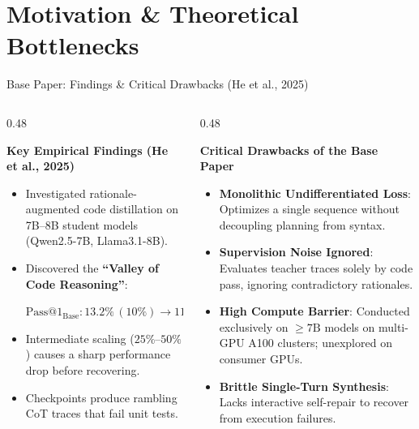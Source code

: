\documentclass[aspectratio=169,10pt]{beamer}
\begin{document}
\section{Motivation \& Theoretical Bottlenecks}

\begin{frame}{Base Paper: Findings \& Critical Drawbacks (He et al., 2025)}
  \begin{columns}[T]
    \begin{column}{0.48\textwidth}
      \begin{block}{\textbf{Key Empirical Findings (He et al., 2025)}}
        \begin{itemize}\itemsep=2.5pt\footnotesize
          \item Investigated rationale-augmented code distillation on 7B--8B student models (Qwen2.5-7B, Llama3.1-8B).
          \item Discovered the \textbf{``Valley of Code Reasoning''}:
          \begin{center}
            \scriptsize
            $\text{Pass@1}_{\text{Base}}: 13.2\% \,(10\%) \to \mathbf{11.2\% \,(25\%)} \to 17.6\% \,(100\%)$
          \end{center}
          \item Intermediate scaling ($25\%\text{--}50\%$) causes a sharp performance drop before recovering.
          \item Checkpoints produce rambling CoT traces that fail unit tests.
        \end{itemize}
      \end{block}
    \end{column}

    \begin{column}{0.48\textwidth}
      \begin{alertblock}{\textbf{Critical Drawbacks of the Base Paper}}
        \begin{itemize}\itemsep=2.5pt\footnotesize
          \item \textbf{Monolithic Undifferentiated Loss}: Optimizes a single sequence without decoupling planning from syntax.
          \item \textbf{Supervision Noise Ignored}: Evaluates teacher traces solely by code pass, ignoring contradictory rationales.
          \item \textbf{High Compute Barrier}: Conducted exclusively on $\ge 7\text{B}$ models on multi-GPU A100 clusters; unexplored on consumer GPUs.
          \item \textbf{Brittle Single-Turn Synthesis}: Lacks interactive self-repair to recover from execution failures.
        \end{itemize}
      \end{alertblock}
    \end{column}
  \end{columns}
\end{frame}
\end{document}
